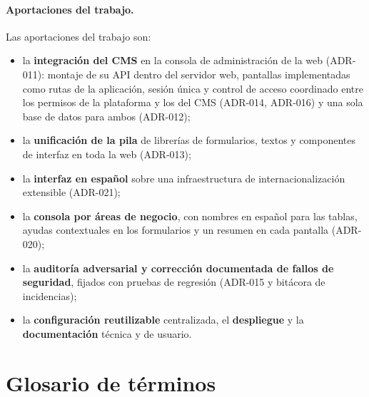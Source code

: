 \paragraph{Aportaciones del trabajo.}
Las aportaciones del trabajo son:

\begin{itemize}
  \item la \textbf{integración del CMS} en la consola de administración de la
        web (ADR-011): montaje de su API dentro del servidor web, pantallas
        implementadas como rutas de la aplicación, sesión única y control de
        acceso coordinado entre los permisos de la plataforma y los del CMS
        (ADR-014, ADR-016) y una sola base de datos para ambos (ADR-012);
  \item la \textbf{unificación de la pila} de librerías de formularios,
        textos y componentes de interfaz en toda la web (ADR-013);
  \item la \textbf{interfaz en español} sobre una infraestructura de
        internacionalización extensible (ADR-021);
  \item la \textbf{consola por áreas de negocio}, con nombres en español
        para las tablas, ayudas contextuales en los formularios y un resumen
        en cada pantalla (ADR-020);
  \item la \textbf{auditoría adversarial y corrección documentada de fallos
        de seguridad}, fijados con pruebas de regresión (ADR-015 y bitácora
        de incidencias);
  \item la \textbf{configuración reutilizable} centralizada, el
        \textbf{despliegue} y la \textbf{documentación} técnica y de usuario.
\end{itemize}

\section{Glosario de términos}
\label{sec:intro-glosario}

